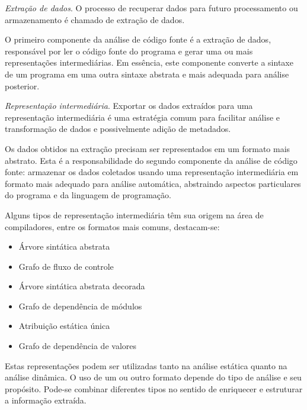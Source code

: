 \begin{description}

  \item \textit{Extração de dados}.
    O processo de recuperar dados para futuro processamento ou armazenamento é
    chamado de extração de dados. 

    O primeiro componente da análise de código fonte é a extração de dados,
    responsável por ler o código fonte do programa e gerar uma ou mais
    representações intermediárias. Em essência, este componente converte a sintaxe
    de um programa em uma outra sintaxe abstrata e mais adequada para análise
    posterior.

  \item \textit{Representação intermediária}.
    Exportar os dados extraídos para uma representação intermediária é uma
    estratégia comum para facilitar análise e transformação de dados e
    possivelmente adição de metadados.

    Os dados obtidos na extração precisam ser representados em um formato mais
    abstrato. Esta é a responsabilidade do segundo componente da análise de
    código fonte: armazenar os dados coletados usando uma representação
    intermediária em formato mais adequado para análise automática, abstraindo
    aspectos particulares do programa e da linguagem de programação.

    Alguns tipos de representação intermediária têm sua origem na área de
    compiladores, entre os formatos mais comuns, destacam-se:

    \begin{multicols}{2}
      \begin{itemize}
        \item Árvore sintática abstrata
        \item Grafo de fluxo de controle
        \item Árvore sintática abstrata decorada
        \item Grafo de dependência de módulos
        \item Atribuição estática única
        \item Grafo de dependência de valores
      \end{itemize}
    \end{multicols}

    Estas representações podem ser utilizadas tanto na análise estática quanto
    na análise dinâmica. O uso de um ou outro formato depende do tipo de
    análise e seu propósito. Pode-se combinar diferentes tipos no sentido de
    enriquecer e estruturar a informação extraída.


\end{description}
